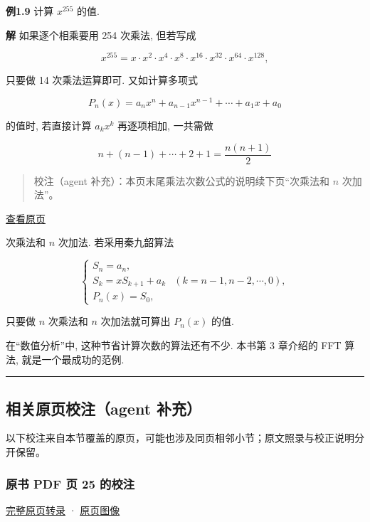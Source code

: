 \documentclass[
  10pt,
  fontset=fandol]{ctexart}
\begin{document}
\textbf{例1.9} 计算 \(x^{255}\) 的值.

\textbf{解} 如果逐个相乘要用 254 次乘法, 但若写成

\[
x^{255} = x \cdot x^2 \cdot x^4 \cdot x^8 \cdot x^{16} \cdot x^{32} \cdot x^{64} \cdot x^{128},
\]

只要做 14 次乘法运算即可. 又如计算多项式

\[
P_n(x) = a_n x^n + a_{n-1} x^{n-1} + \cdots + a_1 x + a_0
\]

的值时, 若直接计算 \(a_k x^k\) 再逐项相加, 一共需做

\[
n + (n-1) + \cdots + 2 + 1 = \frac{n(n+1)}{2}
\]

\begin{quote}
校注（agent 补充）：本页末尾乘法次数公式的说明续下页``次乘法和 \(n\) 次加法''。
\end{quote}

\href{../../source-images/pdf-025.jpeg}{查看原页}

次乘法和 \(n\) 次加法. 若采用秦九韶算法

\[
\begin{cases} S_n = a_n, \\ S_k = xS_{k+1} + a_k & (k=n-1,n-2,\cdots,0), \\ P_n(x) = S_0, \end{cases} \tag{1.4.1}
\]

只要做 \(n\) 次乘法和 \(n\) 次加法就可算出 \(P_n(x)\) 的值.

在``数值分析''中, 这种节省计算次数的算法还有不少. 本书第 3 章介绍的 FFT 算法, 就是一个最成功的范例.

\begin{center}\rule{0.5\linewidth}{0.5pt}\end{center}

\subsection{相关原页校注（agent 补充）}\label{ux76f8ux5173ux539fux9875ux6821ux6ce8agent-ux8865ux5145}

以下校注来自本节覆盖的原页，可能也涉及同页相邻小节；原文照录与校正说明分开保留。

\subsubsection{原书 PDF 页 25 的校注}\label{ux539fux4e66-pdf-ux9875-25-ux7684ux6821ux6ce8}

\href{../pages/pdf-025.md}{完整原页转录} · \href{../../source-images/pdf-025.jpeg}{原页图像}
\end{document}
